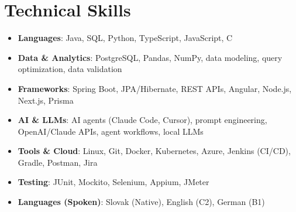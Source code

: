 \documentclass[letterpaper,11pt]{article}
\begin{document}
\section{Technical Skills}
 \begin{itemize}[leftmargin=*, itemsep=0pt]
   \item \textbf{Languages}{: Java, SQL, Python, TypeScript, JavaScript, C}
   \item \textbf{Data \& Analytics}{: PostgreSQL, Pandas, NumPy, data modeling, query optimization, data validation}
   \item \textbf{Frameworks}{: Spring Boot, JPA/Hibernate, REST APIs, Angular, Node.js, Next.js, Prisma}
   \item \textbf{AI \& LLMs}{: AI agents (Claude Code, Cursor), prompt engineering, OpenAI/Claude APIs, agent workflows, local LLMs}
   \item \textbf{Tools \& Cloud}{: Linux, Git, Docker, Kubernetes, Azure, Jenkins (CI/CD), Gradle, Postman, Jira}
   \item \textbf{Testing}{: JUnit, Mockito, Selenium, Appium, JMeter}
   \item \textbf{Languages (Spoken)}{: Slovak (Native), English (C2), German (B1)}
 \end{itemize}

\end{document}
